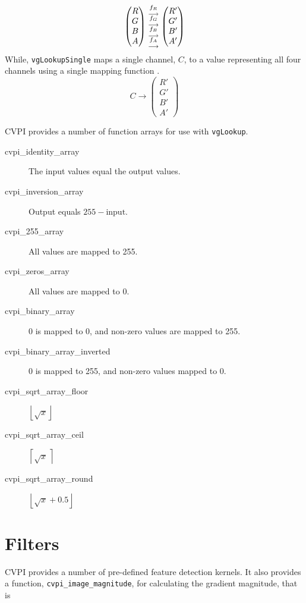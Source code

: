 \documentclass[12pt]{report}
\begin{document}
\[\begin{pmatrix} R \\ G \\ B \\ A \end{pmatrix} \begin{matrix}
    f_R\atop\longrightarrow \\ f_G\atop\longrightarrow \\ f_B\atop\longrightarrow \\ f_A\atop\longrightarrow
    \end{matrix} \begin{pmatrix} R' \\ G' \\ B' \\ A' \end{pmatrix} \]
While, {\tt vgLookupSingle} maps a single channel, $C$, to a value
representing all four channels using a single mapping function \cite{openvg}.
\[C\rightarrow\begin{pmatrix} R' \\ G' \\ B' \\ A' \end{pmatrix}
    \]

CVPI provides a number of function arrays for use with {\tt vgLookup}.
\begin{description}
\item[{cvpi\_identity\_array}] The input values equal the output values.
\item[{cvpi\_inversion\_array}] Output equals $255 - \text{input}$.
\item[{cvpi\_255\_array}] All values are mapped to 255.
\item[{cvpi\_zeros\_array}] All values are mapped to 0.
\item[{cvpi\_binary\_array}] 0 is mapped to 0, and non-zero values are mapped to 255.
\item[{cvpi\_binary\_array\_inverted}] 0 is mapped to 255, and non-zero values mapped to 0.
\item[{cvpi\_sqrt\_array\_floor}] $\left\lfloor\sqrt{x}\right\rfloor$
\item[{cvpi\_sqrt\_array\_ceil}] $\left\lceil\sqrt{x}\,\right\rceil$
\item[{cvpi\_sqrt\_array\_round}] $\left\lfloor\sqrt{x}+0.5\right\rfloor$
\end{description}

\section{Filters}
\label{sec-3-2}
CVPI provides a number of pre-defined feature detection
kernels. It also provides a function, {\tt cvpi\_image\_magnitude}, for
calculating the gradient magnitude, that is
\end{document}

